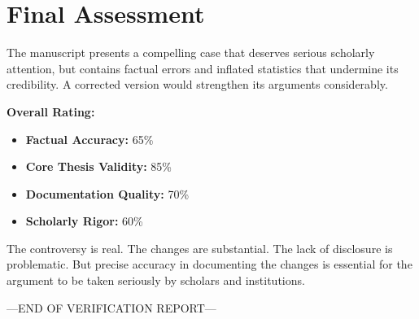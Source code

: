 \documentclass[12pt,twoside]{book}
\begin{document}
\part{Final Assessment}
\label{sec:org764a7d8}

The manuscript presents a compelling case that deserves serious scholarly attention, but contains factual errors and inflated statistics that undermine its credibility. A corrected version would strengthen its arguments considerably.

\textbf{\textbf{Overall Rating:}}
\begin{itemize}
\item \textbf{\textbf{Factual Accuracy:}} 65\%
\item \textbf{\textbf{Core Thesis Validity:}} 85\%
\item \textbf{\textbf{Documentation Quality:}} 70\%
\item \textbf{\textbf{Scholarly Rigor:}} 60\%
\end{itemize}

The controversy is real. The changes are substantial. The lack of disclosure is problematic. But precise accuracy in documenting the changes is essential for the argument to be taken seriously by scholars and institutions.

\vfill
\begin{center}
---END OF VERIFICATION REPORT---
\end{center}
\end{document}
